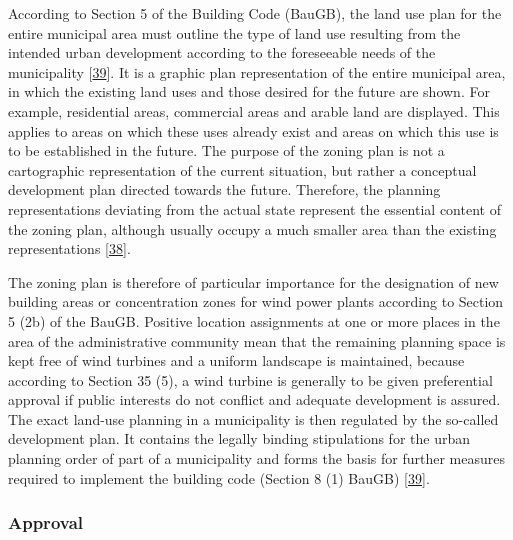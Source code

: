 \documentclass[a4paper,11pt]{article}
\begin{document}
According to Section 5 of the Building Code (BauGB), the land use plan for the entire municipal area must outline the type of land use resulting from the intended urban development according to the foreseeable needs of the municipality {[}\protect\hyperlink{ref-BundesministeriumderJustizundfurVerbraucherschutz.1960}{39}{]}. It is a graphic plan representation of the entire municipal area, in which the existing land uses and those desired for the future are shown. For example, residential areas, commercial areas and arable land are displayed. This applies to areas on which these uses already exist and areas on which this use is to be established in the future. The purpose of the zoning plan is not a cartographic representation of the current situation, but rather a conceptual development plan directed towards the future. Therefore, the planning representations deviating from the actual state represent the essential content of the zoning plan, although usually occupy a much smaller area than the existing representations {[}\protect\hyperlink{ref-MinisteriumdesInnernundfurSport.2017}{38}{]}.

The zoning plan is therefore of particular importance for the designation of new building areas or concentration zones for wind power plants according to Section 5 (2b) of the BauGB. Positive location assignments at one or more places in the area of the administrative community mean that the remaining planning space is kept free of wind turbines and a uniform landscape is maintained, because according to Section 35 (5), a wind turbine is generally to be given preferential approval if public interests do not conflict and adequate development is assured. The exact land-use planning in a municipality is then regulated by the so-called development plan. It contains the legally binding stipulations for the urban planning order of part of a municipality and forms the basis for further measures required to implement the building code (Section 8 (1) BauGB) {[}\protect\hyperlink{ref-BundesministeriumderJustizundfurVerbraucherschutz.1960}{39}{]}.

\hypertarget{approval}{%
\subsubsection{Approval}\label{approval}}
\end{document}
